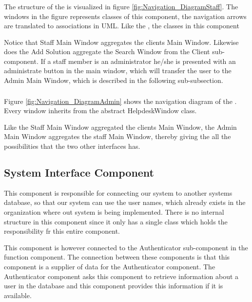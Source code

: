 \subsubsection{\sinterface[]}
The structure of the \sinterface[] is visualized in figure \ref{fig:Navigation_DiagramStaff}.
The windows in the figure represents classes of this component, the navigation arrows are translated to associations in UML.
Like the \cinterface[], the classes in this component



Notice that Staff Main Window aggregates the clients Main Window. Likewise does the Add Solution aggregate the Search Window from the Client sub-component.
If a staff member is an administrator he/she is presented with an administrate button in the main window, which will transfer the user to the Admin Main Window, which is described in the following sub-subsection.


\subsubsection{\ainterface[]}
Figure \ref{fig:Navigation_DiagramAdmin} shows the navigation diagram of the \ainterface[].
Every window inherits from the abstract HelpdeskWindow class.



Like the Staff Main Window aggregated the clients Main Window, the Admin Main Window aggregates the staff Main Window, thereby giving the \ainterface[] all the possibilities that the two other interfaces has.

\subsection{System Interface Component}
This component is responsible for connecting our system to another systems database, so that our system can use the user names, which already exists in the organization where out system is being implemented.
There is no internal structure in this component since it only has a single class which holds the responsibility fr this entire component.

This component is however connected to the Authenticator sub-component in the function component.
The connection between these components is that this component is a supplier of data for the Authenticator component.
The Authenticator component asks this component to retrieve information about a user in the database and this component provides this information if it is available.

